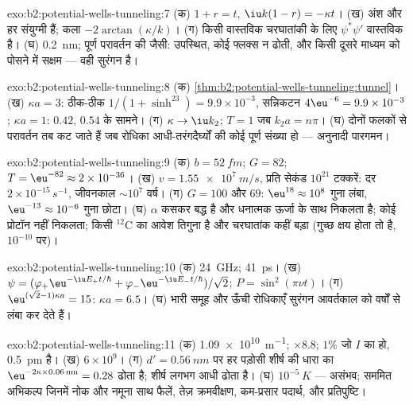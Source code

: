 \begin{solution}{exo:b2:potential-wells-tunneling:7}
(क) $1 + r = t$, $\iu k(1 - r) = -\kappa t$। (ख) अंश और हर
संयुग्मी हैं; कला $-2\arctan(\kappa/k)$। (ग) किसी वास्तविक चरघातांकी के लिए
$\psi^*\psi'$ वास्तविक है। (घ) \qty{0.2}{nm}; पूर्ण परावर्तन की 
जैसी: उपस्थित, कोई फ्लक्स न ढोती, और किसी दूसरे माध्यम को पोसने में सक्षम
--- वही सुरंगन है।
\end{solution}

\begin{solution}{exo:b2:potential-wells-tunneling:8}
(क) \cref{thm:b2:potential-wells-tunneling:tunnel}। (ख) $\kappa a = 3$:
ठीक-ठीक $1/(1 + \sinh^23) = 9.9 \times 10^{-3}$, सन्निकटन $4\eu^{-6} = 9.9 \times
10^{-3}$; $\kappa a = 1$: $0.42$, $0.54$ के सामने। (ग) $\kappa \to \iu k_2$; $T = 1$
जब $k_2a = n\pi$। (घ) दोनों फलकों से परावर्तन तब कट जाते हैं जब
रोधिका आधी-तरंगदैर्घ्यों की कोई पूर्ण संख्या हो --- अनुनादी
पारगमन।
\end{solution}

\begin{solution}{exo:b2:potential-wells-tunneling:9}
(क) $b = \qty{52}{fm}$; $G = 82$; $T = \eu^{-82} \approx 2 \times 10^{-36}$। (ख) $v =
\qty{1.55e7}{m/s}$, प्रति सेकंड $10^{21}$ टक्करें: दर $2 \times 10^{-15}\,\unit{s^{-1}}$,
जीवनकाल $\sim 10^7$ वर्ष। (ग) $G = 100$ और $69$: $\eu^{18} \approx 10^8$ गुना लंबा,
$\eu^{-13} \approx 10^{-6}$ गुना छोटा। (घ) $\alpha$ कसकर बद्ध है और धनात्मक
ऊर्जा के साथ निकलता है; कोई प्रोटॉन नहीं निकलता; किसी $^{12}$C का आवेश तिगुना है
और चरघातांक कहीं बड़ा (गुच्छ क्षय होता तो है, $10^{-10}$ पर)।
\end{solution}

\begin{solution}{exo:b2:potential-wells-tunneling:10}
(क) \qty{24}{GHz}; \qty{41}{ps}। (ख) $\psi = (\varphi_+\eu^{-\iu E_+t/\hbar} +
\varphi_-\eu^{-\iu E_-t/\hbar})/\sqrt2$; $P = \sin^2(\pi\nu t)$। (ग) $\eu^{(\sqrt2 - 1)
\kappa a} = 15$: $\kappa a = 6.5$। (घ) भारी समूह और ऊँची रोधिकाएँ
सुरंगन आवर्तकाल को वर्षों से लंबा कर देते हैं।
\end{solution}

\begin{solution}{exo:b2:potential-wells-tunneling:11}
(क) \qty{1.09e10}{m^{-1}}; $\times 8.8$; $1\%$ जो $I$ का हो, \qty{0.5}{pm} है। (ख) $6 \times 10^9$।
(ग) $d' = \qty{0.56}{nm}$ पर हर पड़ोसी शीर्ष की धारा का $\eu^{-2\kappa \times 0.06\,\text{nm}}
= 0.28$ ढोता है; शीर्ष लगभग आधी ढोता है। (घ)
$10^{-5}\,\unit{K}$ --- असंभव; सममित अभिकल्प जिनमें नोक और नमूना
साथ फैलें, तेज़ क्रमवीक्षण, कम-प्रसार पदार्थ, और प्रतिपुष्टि।
\end{solution}

